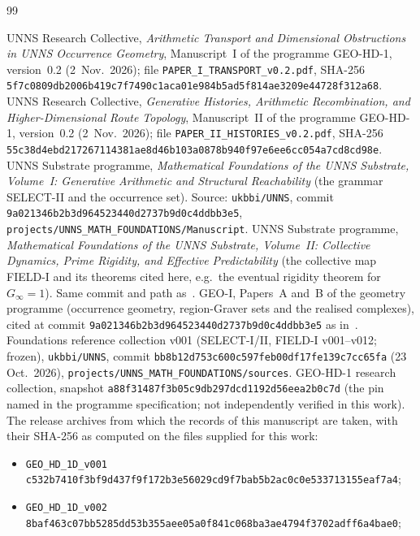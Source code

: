 \clearpage
{}
\begin{thebibliography}{99}\small\raggedright
{} UNNS Research Collective, \emph{Arithmetic Transport and Dimensional Obstructions in UNNS Occurrence Geometry}, Manuscript~I of the programme GEO-HD-1, version~0.2 (2~Nov.\ 2026); file \texttt{PAPER\_I\_TRANSPORT\_v0.2.pdf}, SHA-256 \texttt{5f7c0809db2006b419c7f7490c1aca01e984b5ad5f814ae3209e44728f312a68}.
 UNNS Research Collective, \emph{Generative Histories, Arithmetic Recombination, and Higher-Dimensional Route Topology}, Manuscript~II of the programme GEO-HD-1, version~0.2 (2~Nov.\ 2026); file \texttt{PAPER\_II\_HISTORIES\_v0.2.pdf}, SHA-256 \texttt{55c38d4ebd217267114381ae8d46b103a0878b940f97e6ee6cc054a7cd8cd98e}.
 UNNS Substrate programme, \emph{Mathematical Foundations of the UNNS Substrate, Volume~I: Generative Arithmetic and Structural Reachability} (the grammar SELECT-II and the occurrence set). Source: \texttt{ukbbi/UNNS}, commit \texttt{9a021346b2b3d964523440d2737b9d0c4ddbb3e5}, \texttt{projects/UNNS\_MATH\_FOUNDATIONS/Manuscript}.
 UNNS Substrate programme, \emph{Mathematical Foundations of the UNNS Substrate, Volume~II: Collective Dynamics, Prime Rigidity, and Effective Predictability} (the collective map FIELD-I and its theorems cited here, e.g.\ the eventual rigidity theorem for $G_\infty=1$). Same commit and path as~\cite{FoundI}.
 GEO-I, Papers~A and~B of the geometry programme (occurrence geometry, region-Graver sets and the realised complexes), cited at commit \texttt{9a021346b2b3d964523440d2737b9d0c4ddbb3e5} as in~\cite{FoundI}.
 Foundations reference collection v001 (SELECT-I/II, FIELD-I v001--v012; frozen), \texttt{ukbbi/UNNS}, commit \texttt{bb8b12d753c600c597feb00df17fe139c7cc65fa} (23 Oct.\ 2026), \texttt{projects/UNNS\_MATH\_FOUNDATIONS/sources}.
 GEO-HD-1 research collection, snapshot \texttt{a88f31487f3b05c9db297dcd1192d56eea2b0c7d} (the pin named in the programme specification; not independently verified in this work). The release archives from which the records of this manuscript are taken, with their SHA-256 as computed on the files supplied for this work:
\begin{itemize}[leftmargin=1.4em,itemsep=1pt,topsep=2pt]\footnotesize
\item\texttt{GEO\_HD\_1D\_v001} \texttt{c532b7410f3bf9d437f9f172b3e56029cd9f7bab5b2ac0c0e533713155eaf7a4};
\item\texttt{GEO\_HD\_1D\_v002} \texttt{8baf463c07bb5285dd53b355aee05a0f841c068ba3ae4794f3702adff6a4bae0};

\end{itemize}
\end{thebibliography}
